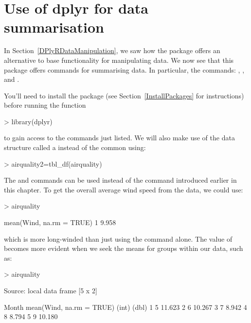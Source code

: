 \section{Use of dplyr for data summarisation}
\label{DPlyRDataSummarisation}


In Section~\ref{DPlyRDataManipulation}, we saw how the  package offers an alternative to base \R{} functionality for manipulating data. We now see that this package offers commands for summarising data. In particular, the commands: , , and .
  
You'll need to install the package (see Section~\ref{InstallPackages} for instructions) before running the function
\begin{Schunk}
\begin{Sinput}
> library(dplyr)
\end{Sinput}
\end{Schunk}
to gain access to the commands just listed. We will also make use of the  data structure called a  instead of the common  using:
\begin{Schunk}
\begin{Sinput}
> airquality2=tbl_df(airquality)
\end{Sinput}
\end{Schunk}


The   and  commands can be used instead of the  command introduced earlier in this chapter. To get the overall average wind speed from the  data, we could use:
\begin{Schunk}
\begin{Sinput}
> airquality %>% summarise(mean(Wind, na.rm = TRUE))
\end{Sinput}
\begin{Soutput}
  mean(Wind, na.rm = TRUE)
1                    9.958
\end{Soutput}
\end{Schunk}
which is more long-winded than just using the  command alone. The value of  becomes more evident when we seek the means for groups within our data, such as:
\begin{Schunk}
\begin{Sinput}
> airquality%>% group_by(Month) %>% summarise(mean(Wind, na.rm = TRUE))
\end{Sinput}
\begin{Soutput}
Source: local data frame [5 x 2]

  Month mean(Wind, na.rm = TRUE)
  (int)                    (dbl)
1     5                   11.623
2     6                   10.267
3     7                    8.942
4     8                    8.794
5     9                   10.180
\end{Soutput}
\end{Schunk}

